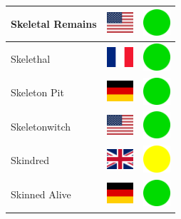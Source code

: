 \documentclass[12pt, a4paper, twoside]{report}
\begin{document}
\begin{center}
\begin{longtable}{|p{5cm}|p{2cm}|p{2cm}|}
 Skeletal Remains                                           & \includegraphics[width=1cm]{../img/flags/us} &   \includegraphics[width=1cm]{../likes/y} \\ \hline
 Skelethal                                                  & \includegraphics[width=1cm]{../img/flags/fr} &   \includegraphics[width=1cm]{../likes/y} \\ \hline
 Skeleton Pit                                               & \includegraphics[width=1cm]{../img/flags/de} &   \includegraphics[width=1cm]{../likes/y} \\ \hline
 Skeletonwitch                                              & \includegraphics[width=1cm]{../img/flags/us} &   \includegraphics[width=1cm]{../likes/y} \\ \hline
 Skindred                                                   & \includegraphics[width=1cm]{../img/flags/gb} &   \includegraphics[width=1cm]{../likes/m} \\ \hline
 Skinned Alive                                              & \includegraphics[width=1cm]{../img/flags/de} &   \includegraphics[width=1cm]{../likes/y} \\ \hline

\end{longtable}
\end{center}
\end{document}

